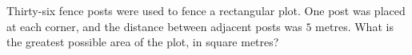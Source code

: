 Thirty-six fence posts were used to fence a rectangular plot. One post was placed at each corner, and the distance between adjacent posts was $5$ metres. What is the greatest possible area of the plot, in square metres?
